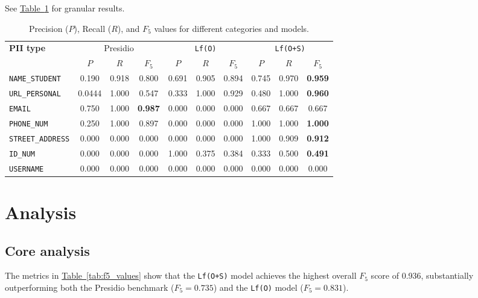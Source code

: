 \documentclass[11pt]{article}
\newcommand{\Tablink}[1]{\hyperref[#1]{Table~\ref*{#1}}}
\begin{document}
See \Tablink{tab:precision_recall_f5} for granular results. 

\begin{table}[t]
  \centering
  \caption{Precision ($P$), Recall ($R$), and $F_5$ values for different categories and models.}
  \label{tab:precision_recall_f5}
  \begin{tabularx}{\textwidth}{Xccccccccc}
    \toprule
    \textbf{PII type} & \multicolumn{3}{c}{Presidio} & \multicolumn{3}{c}{\texttt{Lf(O)}} & \multicolumn{3}{c}{\texttt{Lf(O+S)}} \\
    \cmidrule(lr){2-4} \cmidrule(lr){5-7} \cmidrule(lr){8-10}
    & $P$ & $R$ & $F_5$ & $P$ & $R$ & $F_5$ & $P$ & $R$ & $F_5$ \\
    \midrule
    \texttt{NAME\_STUDENT}     & 0.190 & 0.918 & 0.800 & 0.691 & 0.905 & 0.894 & 0.745 & 0.970 & \textbf{0.959} \\
    \texttt{URL\_PERSONAL}     & 0.0444 & 1.000 & 0.547 & 0.333 & 1.000 & 0.929 & 0.480 & 1.000 & \textbf{0.960} \\
    \texttt{EMAIL}             & 0.750 & 1.000 & \textbf{0.987} & 0.000 & 0.000 & 0.000 & 0.667 & 0.667 & 0.667 \\
    \texttt{PHONE\_NUM}        & 0.250 & 1.000 & 0.897 & 0.000 & 0.000 & 0.000 & 1.000 & 1.000 & \textbf{1.000} \\
    \texttt{STREET\_ADDRESS}   & 0.000 & 0.000 & 0.000 & 0.000 & 0.000 & 0.000 & 1.000 & 0.909 & \textbf{0.912} \\
    \texttt{ID\_NUM}           & 0.000 & 0.000 & 0.000 & 1.000 & 0.375 & 0.384 & 0.333 & 0.500 & \textbf{0.491} \\
    \texttt{USERNAME}          & 0.000 & 0.000 & 0.000 & 0.000 & 0.000 & 0.000 & 0.000 & 0.000 & 0.000 \\
    \bottomrule
  \end{tabularx}
\end{table}

\section{Analysis} 

\subsection{Core analysis}

The metrics in \Tablink{tab:f5_values} show that the \texttt{Lf(O+S)} model achieves the highest overall $F_5$ score of 0.936, substantially outperforming both the Presidio benchmark ($F_5 = 0.735$) and the \texttt{Lf(O)} model ($F_5 = 0.831$).
\end{document}
